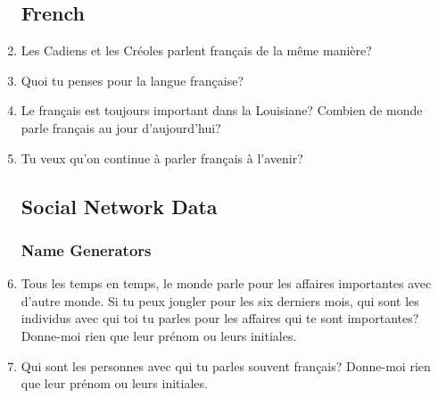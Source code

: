 \begin{enumerate}
  \subsection{French}
    \item Les Cadiens et les Créoles parlent français de la même manière?
    \item Quoi tu penses pour la langue française?
    \item Le français est toujours important dans la Louisiane? Combien de monde parle français au jour d'aujourd'hui?
    \item Tu veux qu'on continue à parler français à l'avenir?
  \subsection{Social Network Data}
    \subsubsection{Name Generators}
    \item Tous les temps en temps, le monde parle pour les affaires importantes avec d'autre monde. Si tu peux jongler pour les six derniers mois, qui sont les individus avec qui toi tu parles pour les affaires qui te sont importantes? Donne-moi rien que leur prénom ou leurs initiales.\\
    \item Qui sont les personnes avec qui tu parles souvent français? Donne-moi rien que leur prénom ou leurs initiales.\\

\end{enumerate}
